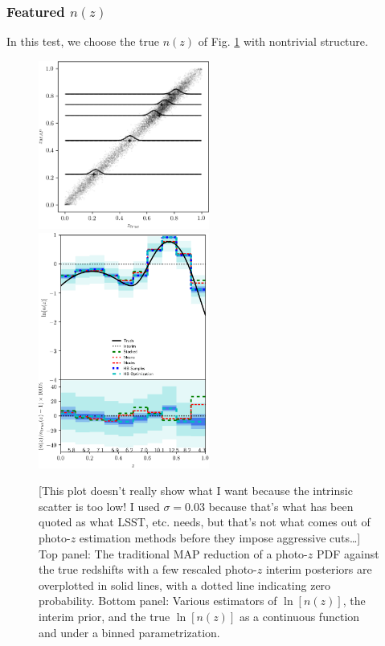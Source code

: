 \documentclass[iop]{emulateapj}
\begin{document}
\subsubsection{Featured $n(z)$}
\label{sec:featured}

In this test, we choose the true $n(z)$ of Fig. \ref{fig:featured} with 
nontrivial structure.

\begin{figure}
	\begin{center}
		
\includegraphics[width=0.5\textwidth]{fig/fiducial/scatter.png}\\
		
\includegraphics[width=0.5\textwidth]{fig/fiducial/estimators.png}		
		\caption{[This plot doesn't really show what I want because the 
intrinsic scatter is too low!  I used $\sigma=0.03$ because that's what has 
been quoted as what LSST, etc. needs, but that's not what comes out of 
photo-$z$ estimation methods before they impose aggressive cuts\dots]  Top 
panel: The traditional MAP reduction of a photo-$z$ PDF against the true 
redshifts with a few rescaled photo-$z$ interim posteriors are overplotted in 
solid lines, with a dotted line indicating zero probability.  Bottom panel: 
Various estimators of $\ln[n(z)]$, the interim prior, and the true $\ln[n(z)]$ 
as a continuous function and under a binned parametrization.}
		\label{fig:featured}
	\end{center}
\end{figure}
\end{document}
